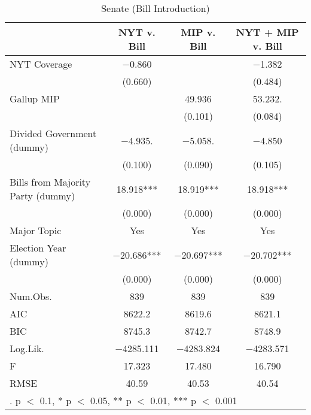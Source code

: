 \documentclass[here]{article}
\begin{document}
\begin{table}[h]

  \caption{Senate (Bill Introduction)}
  \centering
  \begin{tabular}[t]{lccc}
  \toprule
    & NYT v. Bill & MIP v. Bill & NYT + MIP v. Bill\\
  \midrule
  NYT Coverage & \num{-0.860} &  & \num{-1.382}\\
   & (\num{0.660}) &  & (\num{0.484})\\
  Gallup MIP &  & \num{49.936} & \num{53.232}.\\
   &  & (\num{0.101}) & (\num{0.084})\\
  Divided Government (dummy) & \num{-4.935}. & \num{-5.058}. & \num{-4.850}\\
   & (\num{0.100}) & (\num{0.090}) & (\num{0.105})\\
  Bills from Majority Party (dummy) & \num{18.918}*** & \num{18.919}*** & \num{18.918}***\\
   & (\num{0.000}) & (\num{0.000}) & \vphantom{1} (\num{0.000})\\
  Major Topic & Yes & Yes & Yes\\
  Election Year (dummy) & \num{-20.686}*** & \num{-20.697}*** & \num{-20.702}***\\
   & (\num{0.000}) & (\num{0.000}) & (\num{0.000})\\
  Num.Obs. & \num{839} & \num{839} & \num{839}\\
  \midrule
  AIC & \num{8622.2} & \num{8619.6} & \num{8621.1}\\
  BIC & \num{8745.3} & \num{8742.7} & \num{8748.9}\\
  Log.Lik. & \num{-4285.111} & \num{-4283.824} & \num{-4283.571}\\
  F & \num{17.323} & \num{17.480} & \num{16.790}\\
  RMSE & \num{40.59} & \num{40.53} & \num{40.54}\\
  \bottomrule
  \multicolumn{4}{l}{\rule{0pt}{1em}. p $<$ 0.1, * p $<$ 0.05, ** p $<$ 0.01, *** p $<$ 0.001}\\
  \end{tabular}
  \end{table}
\end{document}
